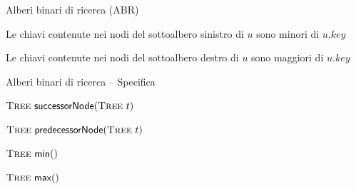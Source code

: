\begin{frame}{Alberi binari di ricerca (ABR)}

\begin{myboxtitle}[Proprietà]
\BEL
\item Le chiavi contenute nei nodi del \alert{sottoalbero sinistro} di $u$ sono \alert{minori} di $u.\mathit{key}$
\item Le chiavi contenute nei  nodi del \alert{sottoalbero destro} di $u$ sono \alert{maggiori} di $u.\mathit{key}$
\EEL
\end{myboxtitle}

\end{frame}

\begin{frame}{Alberi binari di ricerca -- Specifica}

\vspace{-12pt}

\begin{myboxtitle}[Ordinamento]
\BI
\item $\Tree\ \textsf{successorNode}(\Tree\ t)$
\item $\Tree\ \textsf{predecessorNode}(\Tree\ t)$
\item $\textsc{Tree}\ \textsf{min}()$
\item $\textsc{Tree}\ \textsf{max}()$
\EI
\end{myboxtitle}


\end{frame}

